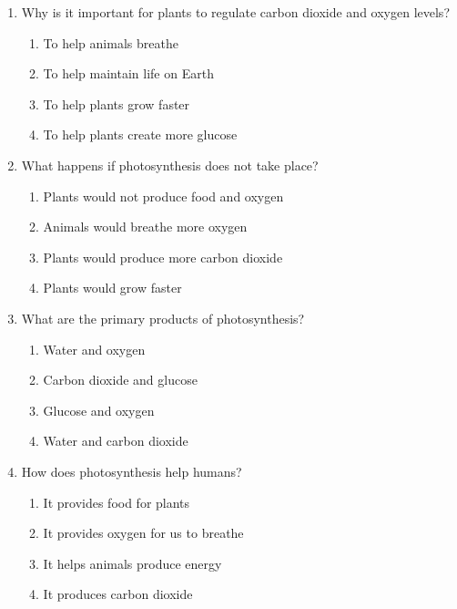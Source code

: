 \documentclass[12pt]{article}
\begin{document}
\begin{enumerate}
    \vspace{0.5cm}

    \item Why is it important for plants to regulate carbon dioxide and oxygen levels?

    \begin{enumerate}[label=\Alph*.]
        \item To help animals breathe
        \item To help maintain life on Earth
        \item To help plants grow faster
        \item To help plants create more glucose
    \end{enumerate}
    
    \vspace{0.5cm}

    \item What happens if photosynthesis does not take place?

    \begin{enumerate}[label=\Alph*.]
        \item Plants would not produce food and oxygen
        \item Animals would breathe more oxygen
        \item Plants would produce more carbon dioxide
        \item Plants would grow faster
    \end{enumerate}
    
    \vspace{0.5cm}

    \item What are the primary products of photosynthesis?

    \begin{enumerate}[label=\Alph*.]
        \item Water and oxygen
        \item Carbon dioxide and glucose
        \item Glucose and oxygen
        \item Water and carbon dioxide
    \end{enumerate}
    
    \vspace{0.5cm}

    \item How does photosynthesis help humans?

    \begin{enumerate}[label=\Alph*.]
        \item It provides food for plants
        \item It provides oxygen for us to breathe
        \item It helps animals produce energy
        \item It produces carbon dioxide
    \end{enumerate}
    

\end{enumerate}
\end{document}
